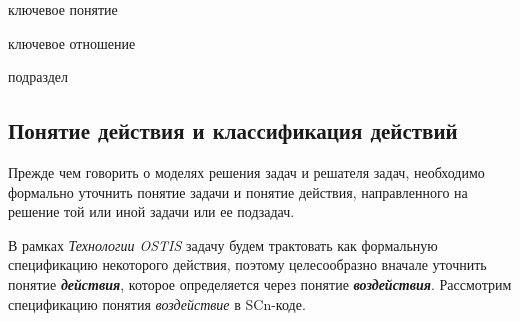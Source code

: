 \begin{SCn}
	\begin{scnrelfromlist}{ключевое понятие}
	\end{scnrelfromlist}

	\begin{scnrelfromlist}{ключевое отношение}
	\end{scnrelfromlist}

	\begin{scnrelfromlist}{подраздел}
	\end{scnrelfromlist}
\end{SCn}

\subsection{Понятие действия и классификация действий}
\label{subsec_action_concept}

Прежде чем говорить о моделях решения задач и решателя задач, необходимо формально уточнить понятие задачи и понятие действия, направленного на решение той или иной задачи или ее подзадач.

В рамках \textit{Технологии OSTIS} задачу будем трактовать как формальную спецификацию некоторого действия, поэтому целесообразно вначале уточнить понятие \textbf{\textit{действия}}, которое определяется через понятие \textbf{\textit{воздействия}}. Рассмотрим спецификацию понятия \textit{воздействие} в SCn-коде.

